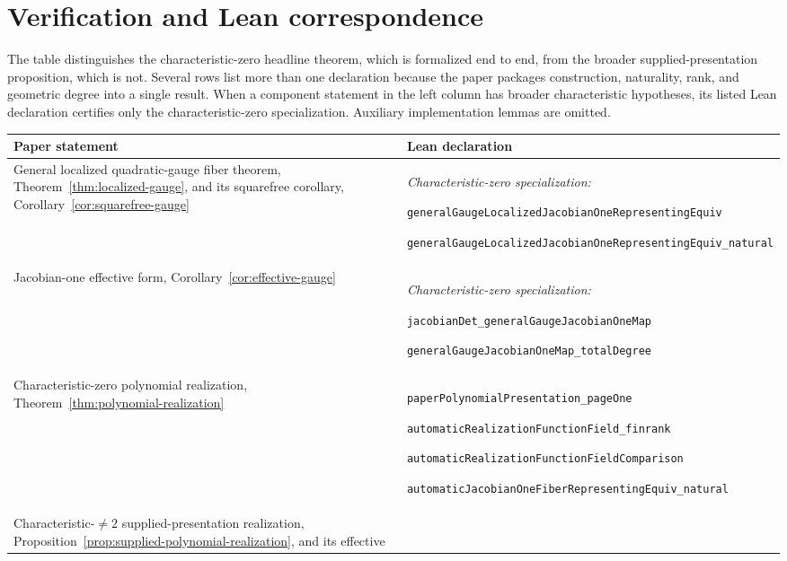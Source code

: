 \section{Verification and Lean correspondence}
\label{app:lean-correspondence}

The table distinguishes the characteristic-zero headline theorem, which is
formalized end to end, from the broader supplied-presentation proposition,
which is not.  Several rows list more than one declaration because the paper
packages construction, naturality, rank, and geometric degree into a single
result.  When a component statement in the left column has broader
characteristic hypotheses, its listed Lean declaration certifies only the
characteristic-zero specialization.  Auxiliary implementation lemmas are
omitted.

\begin{center}
\footnotesize
\renewcommand{\arraystretch}{1.08}
\begin{tabular}{
 >{\raggedright\arraybackslash}p{}
 >{\raggedright\arraybackslash}p{}}
\hline
\textbf{Paper statement}&\textbf{Lean declaration}\\
\hline
General localized quadratic-gauge fiber theorem,
Theorem~\ref{thm:localized-gauge}, and its squarefree corollary,
Corollary~\ref{cor:squarefree-gauge}
&
\textit{Characteristic-zero specialization:}\par
\nolinkurl{generalGaugeLocalizedJacobianOneRepresentingEquiv}\par
\nolinkurl{generalGaugeLocalizedJacobianOneRepresentingEquiv_natural}
\\
\hline
Jacobian-one effective form,
Corollary~\ref{cor:effective-gauge}
&
\textit{Characteristic-zero specialization:}\par
\nolinkurl{jacobianDet_generalGaugeJacobianOneMap}\par
\nolinkurl{generalGaugeJacobianOneMap_totalDegree}
\\
\hline
Characteristic-zero polynomial realization,
Theorem~\ref{thm:polynomial-realization}
&
\nolinkurl{paperPolynomialPresentation_pageOne}\par
\nolinkurl{automaticRealizationFunctionField_finrank}\par
\nolinkurl{automaticRealizationFunctionFieldComparison}\par
\nolinkurl{automaticJacobianOneFiberRepresentingEquiv_natural}
\\
\hline
Characteristic-\(\ne2\) supplied-presentation realization,
Proposition~\ref{prop:supplied-polynomial-realization}, and its effective

\end{tabular}
\end{center}
